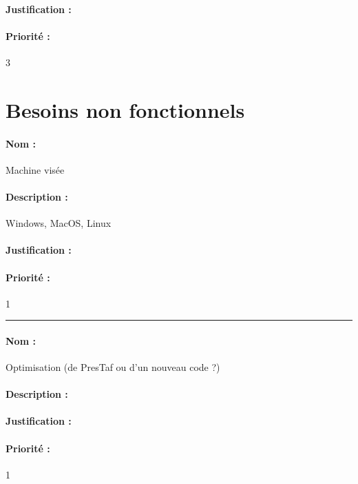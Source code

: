 \documentclass{article}%
\begin{document}
\paragraph{Justification :}

\paragraph{Priorité :} 3

\section{Besoins non fonctionnels}

\paragraph{Nom :} Machine visée

\paragraph{Description :} Windows, MacOS, Linux

\paragraph{Justification :}

\paragraph{Priorité :} 1\\

\rule{\linewidth}{1pt}

\paragraph{Nom :} Optimisation (de PresTaf ou d'un nouveau code ?)

\paragraph{Description :}

\paragraph{Justification :}

\paragraph{Priorité :} 1
\end{document}
